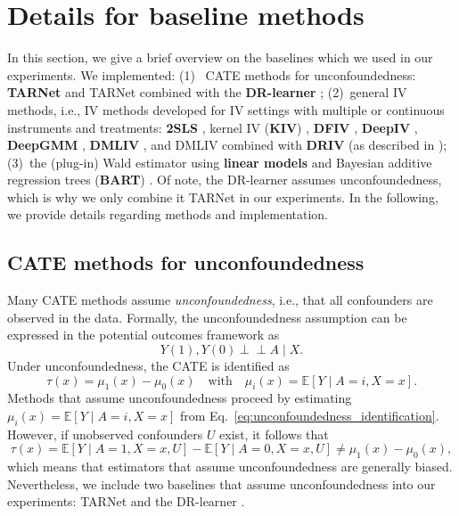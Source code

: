 \documentclass{article} %
\newcommand{\indep}{\perp \!\!\! \perp}
\newcommand{\E}{\mathbb{E}}
\theoremstyle{definition}
\theoremstyle{plain}
\begin{document}

\clearpage

\section{Details for baseline methods}\label{app:baseline}

In this section, we give a brief overview on the baselines which we used in our experiments. We implemented: (1)~ CATE methods for unconfoundedness: \textbf{TARNet} \citep{Shalit.2017} and TARNet combined with the \textbf{DR-learner} \citep{Kennedy.2022d}; (2)~general IV methods, i.e., IV methods developed for IV settings with multiple or continuous instruments and treatments: \textbf{2SLS} \citep{Wright.1928}, kernel IV (\textbf{KIV}) \citep{Singh.2019}, \textbf{DFIV} \citep{Xu.2021}, \textbf{DeepIV} \citep{Hartford.2017}, \textbf{DeepGMM} \citep{Bennett.2019}, \textbf{DMLIV} \citep{Syrgkanis.2019}, and DMLIV combined with \textbf{DRIV} (as described in \citep{Syrgkanis.2019}); (3)~the (plug-in) Wald estimator using \textbf{linear models} and Bayesian additive regression trees (\textbf{BART}) \citep{Chipman.2010}. Of note, the DR-learner assumes unconfoundedness, which is why we only combine it TARNet in our experiments. In the following, we provide details regarding methods and implementation.

\subsection{CATE methods for unconfoundedness}
Many CATE methods assume \emph{unconfoundedness}, i.e., that all confounders are observed in the data. Formally, the unconfoundedness assumption can be expressed in the potential outcomes framework as
\begin{equation}
    Y(1), Y(0) \indep A \mid X.
\end{equation}
Under unconfoundedness, the CATE is identified as
\begin{equation}\label{eq:unconfoundedness_identification}
    \tau(x) = \mu_1(x) - \mu_0(x) \quad \text{with} \quad \mu_i(x) = \E[Y \mid A = i, X = x].
\end{equation}
Methods that assume unconfoundedness proceed by estimating $\mu_i(x) = \E[Y \mid A = i, X = x]$ from Eq.~\eqref{eq:unconfoundedness_identification}. However, if unobserved confounders $U$ exist, it follows that
\begin{equation}
    \tau(x) = \E[Y \mid A = 1, X = x, U] - \E[Y \mid A = 0, X = x, U] \neq \mu_1(x) - \mu_0(x),
\end{equation}
which means that estimators that assume unconfoundedness are generally biased. Nevertheless, we include two baselines that assume unconfoundedness into our experiments: TARNet \citep{Shalit.2017} and the DR-learner \citep{Kennedy.2022d}.
\end{document}
